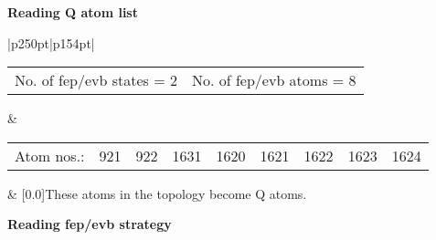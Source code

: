 \documentclass[a4paper,10pt]{article}
\begin{document}
\normalsize
\textbf{Reading Q atom list}
\tiny
\vspace{-1\baselineskip}
\begin{longtable}{|p{250pt}|p{154pt}|}
\hline \begin{tabular}{p{} p{}}No. of fep/evb states = 2 & No. of fep/evb atoms = 8\end{tabular} & \\
\hline \begin{tabular}{lllllllll}Atom nos.: & 921 & 922 & 1631 & 1620 & 1621 & 1622 & 1623 & 1624\end{tabular} & [0.0\baselineskip]{These atoms in the topology become Q atoms.}\\
\hline
\end{longtable}

\normalsize
\textbf{Reading fep/evb strategy}
\tiny
\vspace{-1\baselineskip}
\end{document}
